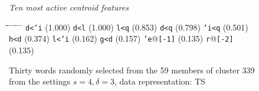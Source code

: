 \begin{figure}[!t]
\begin{mdframed}
\begin{normalsize}
\begin{tabbing}
\end{tabbing}
\end{normalsize}
\vspace{-5pt}
\begin{mdframed}
\begin{small}
\textit{Ten most active centroid features}
\vspace{-3pt}
\begin{tabbing}
\hspace*{6ex}\= \hspace*{10ex}\= \hspace*{6ex}\= \hspace*{10ex} \= \hspace*{7ex} \= \hspace*{11ex} \= \hspace*{7ex}\= \hspace*{11ex} \= \hspace*{7ex} \= \hspace*{9.5ex}\kill
\texttt{d<\a'{i}} \> (1.000) \> \texttt{d<l} \> (1.000) \> \texttt{l<q} \> (0.853) \> \texttt{d<q} \> (0.798) \> \texttt{\a'{i}<q} \> (0.501)\\
\texttt{h<d} \> (0.374) \> \texttt{l<\a'{i}} \> (0.162) \> \texttt{g<d} \> (0.157) \> \texttt{\a'{e}}@\texttt{[-1]} \> (0.135) \> \texttt{r}@\texttt{[-2]} \> (0.135)
\end{tabbing}
\end{small}
\end{mdframed}
\vspace{-5pt}
\caption{Thirty words randomly selected from the 59 members of cluster 339 from the settings $s=4,\delta =3$, data representation: TS}
\label{fig:cluster-339-4-3-TS}
\end{mdframed}
\end{figure}

